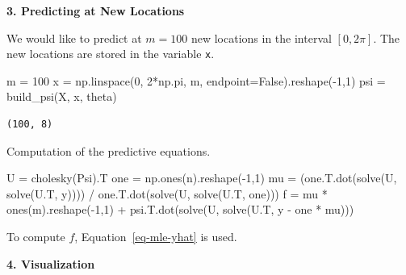 \documentclass[
  letterpaper,
  DIV=11,
  numbers=noendperiod]{scrreprt}
\newenvironment{Shaded}{\begin{snugshade}}{\end{snugshade}}
\newcommand{\DecValTok}[1]{\textcolor[rgb]{0.68,0.00,0.00}{#1}}
\newcommand{\NormalTok}[1]{\textcolor[rgb]{0.00,0.23,0.31}{#1}}
\newcommand{\OperatorTok}[1]{\textcolor[rgb]{0.37,0.37,0.37}{#1}}
\newcommand{\VariableTok}[1]{\textcolor[rgb]{0.07,0.07,0.07}{#1}}
\begin{document}
\begin{tcolorbox}
\textbf{3. Predicting at New Locations}

We would like to predict at \(m = 100\) new locations in the interval
\([0, 2\pi]\). The new locations are stored in the variable \texttt{x}.

\begin{Shaded}
\begin{Highlighting}[]
\NormalTok{m }\OperatorTok{=} \DecValTok{100}
\NormalTok{x }\OperatorTok{=}\NormalTok{ np.linspace(}\DecValTok{0}\NormalTok{, }\DecValTok{2}\OperatorTok{*}\NormalTok{np.pi, m, endpoint}\OperatorTok{=}\VariableTok{False}\NormalTok{).reshape(}\OperatorTok{{-}}\DecValTok{1}\NormalTok{,}\DecValTok{1}\NormalTok{)}
\NormalTok{psi }\OperatorTok{=}\NormalTok{ build\_psi(X, x, theta)}
\end{Highlighting}
\end{Shaded}

\begin{verbatim}
(100, 8)
\end{verbatim}

Computation of the predictive equations.

\begin{Shaded}
\begin{Highlighting}[]
\NormalTok{U }\OperatorTok{=}\NormalTok{ cholesky(Psi).T}
\NormalTok{one }\OperatorTok{=}\NormalTok{ np.ones(n).reshape(}\OperatorTok{{-}}\DecValTok{1}\NormalTok{,}\DecValTok{1}\NormalTok{)}
\NormalTok{mu }\OperatorTok{=}\NormalTok{ (one.T.dot(solve(U, solve(U.T, y)))) }\OperatorTok{/}\NormalTok{ one.T.dot(solve(U, solve(U.T, one)))}
\NormalTok{f }\OperatorTok{=}\NormalTok{ mu }\OperatorTok{*}\NormalTok{ ones(m).reshape(}\OperatorTok{{-}}\DecValTok{1}\NormalTok{,}\DecValTok{1}\NormalTok{) }\OperatorTok{+}\NormalTok{ psi.T.dot(solve(U, solve(U.T, y }\OperatorTok{{-}}\NormalTok{ one }\OperatorTok{*}\NormalTok{ mu)))}
\end{Highlighting}
\end{Shaded}

To compute \(f\), Equation~\ref{eq-mle-yhat} is used.

\textbf{4. Visualization}


\end{tcolorbox}
\end{document}
